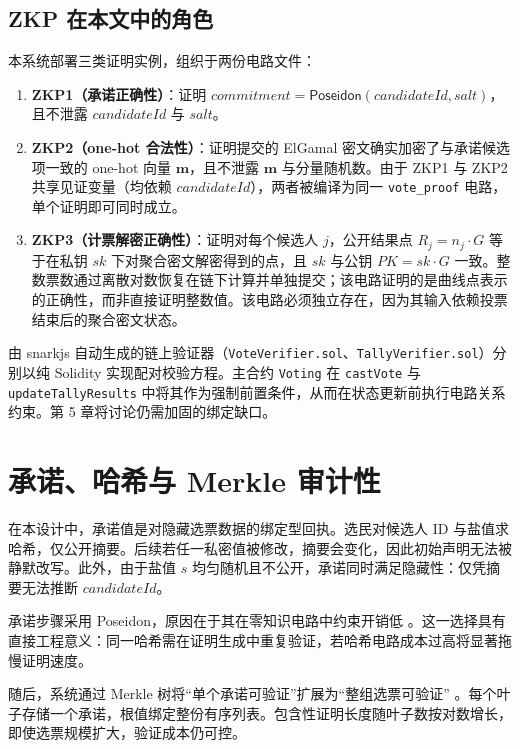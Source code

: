 \subsection{ZKP 在本文中的角色}

本系统部署三类证明实例，组织于两份电路文件：
\begin{enumerate}
    \item \textbf{ZKP1（承诺正确性）}：证明 $\mathit{commitment} = \mathsf{Poseidon}(\mathit{candidateId}, \mathit{salt})$，且不泄露 $\mathit{candidateId}$ 与 $\mathit{salt}$。
    \item \textbf{ZKP2（one-hot 合法性）}：证明提交的 ElGamal 密文确实加密了与承诺候选项一致的 one-hot 向量 $\mathbf{m}$，且不泄露 $\mathbf{m}$ 与分量随机数。由于 ZKP1 与 ZKP2 共享见证变量（均依赖 $\mathit{candidateId}$），两者被编译为同一 \texttt{vote\_proof} 电路，单个证明即可同时成立。
    \item \textbf{ZKP3（计票解密正确性）}：证明对每个候选人 $j$，公开结果点 $R_j = n_j \cdot G$ 等于在私钥 $sk$ 下对聚合密文解密得到的点，且 $sk$ 与公钥 $PK = sk \cdot G$ 一致。整数票数通过离散对数恢复在链下计算并单独提交；该电路证明的是曲线点表示的正确性，而非直接证明整数值。该电路必须独立存在，因为其输入依赖投票结束后的聚合密文状态。
\end{enumerate}

由 snarkjs 自动生成的链上验证器（\texttt{VoteVerifier.sol}、\texttt{TallyVerifier.sol}）分别以纯 Solidity 实现配对校验方程。主合约 \texttt{Voting} 在 \texttt{castVote} 与 \texttt{updateTallyResults} 中将其作为强制前置条件，从而在状态更新前执行电路关系约束。第 5 章将讨论仍需加固的绑定缺口。

\section{承诺、哈希与 Merkle 审计性}

在本设计中，承诺值是对隐藏选票数据的绑定型回执。选民对候选人 ID 与盐值求哈希，仅公开摘要。后续若任一私密值被修改，摘要会变化，因此初始声明无法被静默改写。此外，由于盐值 $s$ 均匀随机且不公开，承诺同时满足隐藏性：仅凭摘要无法推断 $\mathit{candidateId}$。

承诺步骤采用 Poseidon，原因在于其在零知识电路中约束开销低 \cite{poseidon2019}。这一选择具有直接工程意义：同一哈希需在证明生成中重复验证，若哈希电路成本过高将显著拖慢证明速度。

随后，系统通过 Merkle 树将“单个承诺可验证”扩展为“整组选票可验证” \cite{merkle1988}。每个叶子存储一个承诺，根值绑定整份有序列表。包含性证明长度随叶子数按对数增长，即使选票规模扩大，验证成本仍可控。

